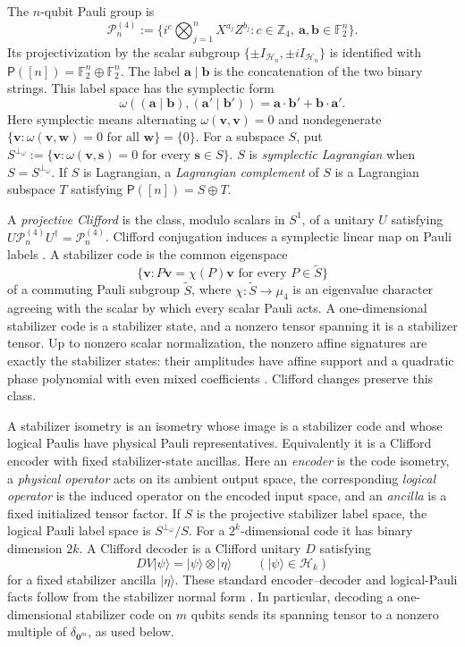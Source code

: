 \documentclass[11pt,letterpaper,onecolumn]{article}
\theoremstyle{plain}
\theoremstyle{definition}
\theoremstyle{remark}
\newcommand{\Ftwo}{\mathbb F_2}
\newcommand{\zero}{\mathbf 0}
\begin{document}
The \(n\)-qubit Pauli group is
\[
 \mathcal P_n^{(4)}
 :=
 \{i^c\textstyle\bigotimes_{j=1}^nX^{a_j}Z^{b_j}:
   c\in\mathbb Z_4,\ {\mathbf{a}},{\mathbf{b}}\in\Ftwo^n\}.
\]
Its projectivization by the scalar subgroup
\(\{\pm I_{\mathcal H_n},\pm iI_{\mathcal H_n}\}\) is identified with
\(\mathsf P([n])=\Ftwo^n\oplus\Ftwo^n\). The label
\({\mathbf{a}}\mid {\mathbf{b}}\) is the concatenation of the two binary strings.  This label space
has the symplectic form
\[
 \omega(({\mathbf{a}}\mid {\mathbf{b}}),({\mathbf{a}}'\mid {\mathbf{b}}'))={\mathbf{a}}\cdot {\mathbf{b}}'+{\mathbf{b}}\cdot {\mathbf{a}}'.
\]
Here symplectic means alternating
\(\omega({\mathbf{v}},{\mathbf{v}})=0\) and nondegenerate
\(\{{\mathbf{v}}:\omega({\mathbf{v}},{\mathbf{w}})=0\text{ for all }{\mathbf{w}}\}=\{0\}\).  For a subspace \(S\),
put \(S^{\perp_\omega}:=\{{\mathbf{v}}:\omega({\mathbf{v}},{\mathbf{s}})=0\text{ for every }{\mathbf{s}}\in S\}\).
\(S\) is \emph{symplectic Lagrangian} when \(S=S^{\perp_\omega}\).  If \(S\) is
Lagrangian, a \emph{Lagrangian complement} of \(S\) is a Lagrangian subspace
\(T\) satisfying \(\mathsf P([n])=S\oplus T\).

A \emph{projective Clifford} is the class, modulo scalars in \(S^1\),
of a unitary \(U\) satisfying
\(U\mathcal P_n^{(4)}U^\dagger=\mathcal P_n^{(4)}\).  Clifford conjugation induces a symplectic linear map
on Pauli labels \cite[Chapter~10]{NielsenChuang2010}.  A stabilizer code is
the common eigenspace
\[
 \{{\mathbf{v}}:P {\mathbf{v}}=\chi(P){\mathbf{v}}\text{ for every }P\in\widetilde S\}
\]
of a commuting Pauli subgroup \(\widetilde S\), where
\(\chi:\widetilde S\to\mu_4\) is an eigenvalue character agreeing with the
scalar by which every scalar Pauli acts.  A
one-dimensional stabilizer code is a stabilizer state, and a nonzero tensor
spanning it is a stabilizer tensor.
Up to nonzero scalar normalization, the nonzero affine signatures are
exactly the stabilizer states: their amplitudes have affine support and
a quadratic phase polynomial with even mixed coefficients
\cite[Theorem~5]{DehaeneDeMoor2003}. Clifford changes preserve this class.

A stabilizer isometry is an isometry whose image is a stabilizer code and
whose logical Paulis have physical Pauli representatives. Equivalently it is
a Clifford encoder with fixed stabilizer-state ancillas.  Here an
\emph{encoder} is the code isometry, a \emph{physical operator} acts on its
ambient output space, the corresponding \emph{logical operator} is the
induced operator on the encoded input space, and an \emph{ancilla} is a fixed
initialized tensor factor.  If \(S\) is the
projective stabilizer label space, the logical Pauli label space is
\(S^{\perp_\omega}/S\). For a \(2^k\)-dimensional code it has binary
dimension \(2k\).  A Clifford decoder is a Clifford unitary \(D\) satisfying
\[
 DV|\psi\rangle=|\psi\rangle\otimes|\eta\rangle
 \qquad(|\psi\rangle\in\mathcal H_k)
\]
for a fixed stabilizer ancilla \(|\eta\rangle\).  These standard
encoder--decoder and logical-Pauli facts follow from the stabilizer normal
form \cite[Chapters~3--4]{Gottesman1997}. In particular, decoding a
one-dimensional stabilizer code on \(m\) qubits sends its spanning tensor to a nonzero
multiple of \(\delta_{\zero^m}\), as used below.
\end{document}
